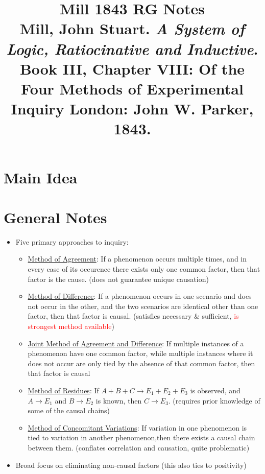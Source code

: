\documentclass[12pt]{article}
\title{\textbf{Mill 1843 RG Notes}\\
\large Mill, John Stuart. \textit{A System of Logic, Ratiocinative and Inductive}.\\
\large Book III, Chapter VIII: Of the Four Methods of Experimental Inquiry
London: John W. Parker, 1843.}
\author{}
\date{}
\begin{document}
\maketitle

\section{Main Idea}



\section{General Notes}

\begin{itemize}[leftmargin=*, itemsep=4pt]
    \item Five primary approaches to inquiry:
    \begin{itemize}
        \item \underline{Method of Agreement}: If a phenomenon occurs multiple times, and in every case of its occurence there exists only one common factor, then that factor is the cause. (does not guarantee unique causation)
        \item \underline{Method of Difference}: If a phenomenon occurs in one scenario and does not occur in the other, and the two scenarios are identical other than one factor, then that factor is causal. (satisfies necessary \& sufficient, \textcolor{red}{is strongest method available})
        \item \underline{Joint Method of Agreement and Difference}: If multiple instances of a phenomenon have one common factor, while multiple instances where it does not occur are only tied by the absence of that common factor, then that factor is causal
        \item \underline{Method of Residues}: If $A + B + C \rightarrow E_1 + E_2 + E_3$ is observed, and $A \rightarrow E_1$ and $B \rightarrow E_2$ is known, then $C \rightarrow E_3$. (requires prior knowledge of some of the causal chains)
        \item \underline{Method of Concomitant Variations}: If variation in one phenomenon is tied to variation in another phenomenon,then there exists a causal chain between them. (conflates correlation and causation, quite problematic)
    \end{itemize}
    \item Broad focus on eliminating non-causal factors (this also ties to positivity)
\end{itemize}
\end{document}

